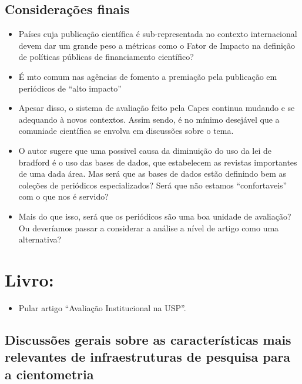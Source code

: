 \documentclass[11pt]{article}
\begin{document}
\subsection{Considerações finais}
\label{sec:org63d7e4b}

\begin{itemize}
\item Países cuja publicação científica é sub-representada no contexto internacional devem dar um grande peso a métricas como o Fator de Impacto na definição de políticas públicas de financiamento científico?

\item É mto comum nas agências de fomento a premiação pela publicação em periódicos de ``alto impacto''

\item Apesar disso, o sistema de avaliação feito pela Capes continua mudando e se adequando à novos contextos. Assim sendo, é no mínimo desejável que a comuniade científica se envolva em discussões sobre o tema.

\item O autor sugere que uma possivel causa da diminuição do uso da lei de bradford é o uso das bases de dados, que estabelecem as revistas importantes de uma dada área. Mas será que as bases de dados estão definindo bem as coleções de periódicos especializados? Será que não estamos ``confortaveis'' com o que nos é servido?

\item Mais do que isso, será que os periódicos são uma boa unidade de avaliação? Ou deveríamos passar a considerar a análise a nível de artigo como uma alternativa?
\end{itemize}

\section{Livro: \cite{mugnaini2017a}}
\label{sec:orga18be2b}

\begin{itemize}
\item Pular artigo “Avaliação Institucional na USP”.
\end{itemize}

\subsection{Discussões gerais sobre as características mais relevantes de infraestruturas de pesquisa para a cientometria}
\label{sec:org35c85a4}
\end{document}
